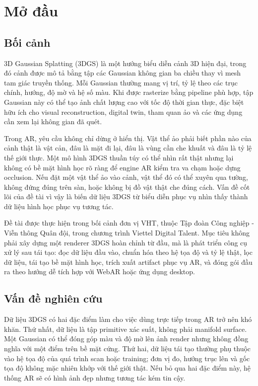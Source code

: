 \section{Mở đầu}

\subsection{Bối cảnh}

3D Gaussian Splatting (3DGS) là một hướng biểu diễn cảnh 3D hiện đại, trong đó cảnh được mô tả bằng tập các Gaussian không gian ba chiều thay vì mesh tam giác truyền thống. Mỗi Gaussian thường mang vị trí, tỷ lệ theo các trục chính, hướng, độ mờ và hệ số màu. Khi được rasterize bằng pipeline phù hợp, tập Gaussian này có thể tạo ảnh chất lượng cao với tốc độ thời gian thực, đặc biệt hữu ích cho visual reconstruction, digital twin, tham quan ảo và các ứng dụng cần xem lại không gian đã quét.

Trong AR, yêu cầu không chỉ dừng ở hiển thị. Vật thể ảo phải biết phần nào của cảnh thật là vật cản, đâu là mặt đi lại, đâu là vùng cần che khuất và đâu là tỷ lệ thế giới thực. Một mô hình 3DGS thuần túy có thể nhìn rất thật nhưng lại không có bề mặt hình học rõ ràng để engine AR kiểm tra va chạm hoặc dựng occlusion. Nếu đặt một vật thể ảo vào cảnh, vật thể đó có thể xuyên qua tường, không đứng đúng trên sàn, hoặc không bị đồ vật thật che đúng cách. Vấn đề cốt lõi của đề tài vì vậy là biến dữ liệu 3DGS từ biểu diễn phục vụ nhìn thấy thành dữ liệu hình học phục vụ tương tác.

Đề tài được thực hiện trong bối cảnh đơn vị VHT, thuộc Tập đoàn Công nghiệp - Viễn thông Quân đội, trong chương trình Viettel Digital Talent. Mục tiêu không phải xây dựng một renderer 3DGS hoàn chỉnh từ đầu, mà là phát triển công cụ xử lý sau tái tạo: đọc dữ liệu đầu vào, chuẩn hóa theo hệ tọa độ và tỷ lệ thật, lọc dữ liệu, tái tạo bề mặt hình học, trích xuất artifact phục vụ AR, và đóng gói đầu ra theo hướng dễ tích hợp với WebAR hoặc ứng dụng desktop.

\subsection{Vấn đề nghiên cứu}

Dữ liệu 3DGS có hai đặc điểm làm cho việc dùng trực tiếp trong AR trở nên khó khăn. Thứ nhất, dữ liệu là tập primitive xác suất, không phải manifold surface. Một Gaussian có thể đóng góp màu và độ mờ lên ảnh render nhưng không đồng nghĩa với một điểm trên bề mặt cứng. Thứ hai, dữ liệu tái tạo thường phụ thuộc vào hệ tọa độ của quá trình scan hoặc training; đơn vị đo, hướng trục lên và gốc tọa độ không mặc nhiên khớp với thế giới thật. Nếu bỏ qua hai đặc điểm này, hệ thống AR sẽ có hình ảnh đẹp nhưng tương tác kém tin cậy.

